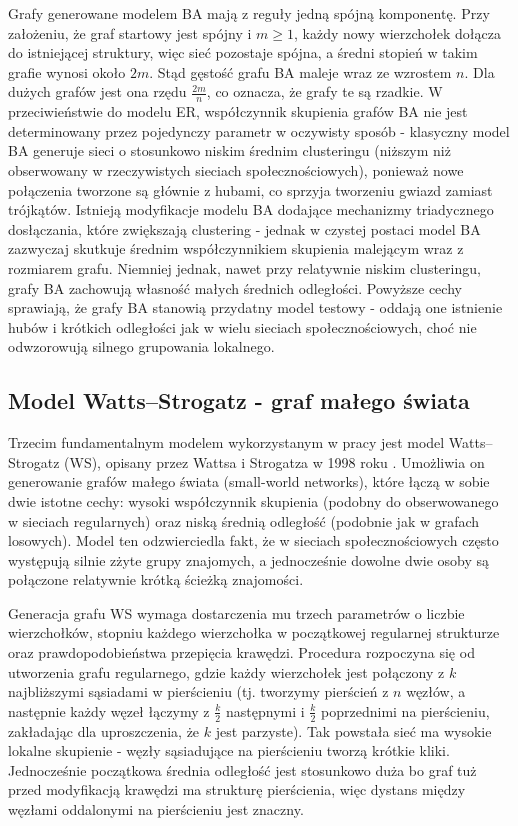 Grafy generowane modelem BA mają z reguły jedną spójną komponentę. Przy założeniu, że graf startowy jest spójny i $m \ge 1$, każdy nowy wierzchołek dołącza do istniejącej struktury, więc sieć pozostaje spójna, a średni stopień w takim grafie wynosi około $2m$. Stąd gęstość grafu BA maleje wraz ze wzrostem $n$. Dla dużych grafów jest ona rzędu $\frac{2m}{n}$, co oznacza, że grafy te są rzadkie. W przeciwieństwie do modelu ER, współczynnik skupienia grafów BA nie jest determinowany przez pojedynczy parametr w oczywisty sposób - klasyczny model BA generuje sieci o stosunkowo niskim średnim clusteringu (niższym niż obserwowany w rzeczywistych sieciach społecznościowych), ponieważ nowe połączenia tworzone są głównie z hubami, co sprzyja tworzeniu gwiazd zamiast trójkątów. Istnieją modyfikacje modelu BA dodające mechanizmy triadycznego dosłączania, które zwiększają clustering - jednak w czystej postaci model BA zazwyczaj skutkuje średnim współczynnikiem skupienia malejącym wraz z rozmiarem grafu. Niemniej jednak, nawet przy relatywnie niskim clusteringu, grafy BA zachowują własność małych średnich odległości. Powyższe cechy sprawiają, że grafy BA stanowią przydatny model testowy - oddają one istnienie hubów i krótkich odległości jak w wielu sieciach społecznościowych, choć nie odwzorowują silnego grupowania lokalnego.

\subsection{Model Watts--Strogatz - graf małego świata}
Trzecim fundamentalnym modelem wykorzystanym w pracy jest model Watts--Strogatz (WS), opisany przez Wattsa i Strogatza w 1998 roku \cite{Watts1998}. Umożliwia on generowanie grafów małego świata (small-world networks), które łączą w sobie dwie istotne cechy: wysoki współczynnik skupienia (podobny do obserwowanego w sieciach regularnych) oraz niską średnią odległość (podobnie jak w grafach losowych). Model ten odzwierciedla fakt, że w sieciach społecznościowych często występują silnie zżyte grupy znajomych, a jednocześnie dowolne dwie osoby są połączone relatywnie krótką ścieżką znajomości.

Generacja grafu WS wymaga dostarczenia mu trzech parametrów o liczbie wierzchołków, stopniu każdego wierzchołka w początkowej regularnej strukturze oraz prawdopodobieństwa przepięcia krawędzi. Procedura rozpoczyna się od utworzenia grafu regularnego, gdzie każdy wierzchołek jest połączony z $k$ najbliższymi sąsiadami w pierścieniu (tj. tworzymy pierścień z $n$ węzłów, a następnie każdy węzeł łączymy z $\frac{k}{2}$ następnymi i $\frac{k}{2}$ poprzednimi na pierścieniu, zakładając dla uproszczenia, że $k$ jest parzyste). Tak powstała sieć ma wysokie lokalne skupienie - węzły sąsiadujące na pierścieniu tworzą krótkie kliki. Jednocześnie początkowa średnia odległość jest stosunkowo duża bo graf tuż przed modyfikacją krawędzi ma strukturę pierścienia, więc dystans między węzłami oddalonymi na pierścieniu jest znaczny.

